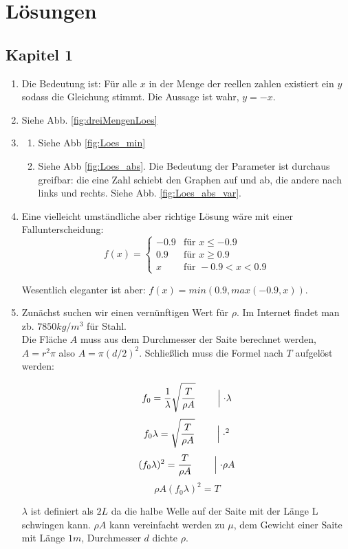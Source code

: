 \chapter{Lösungen}

\section{Kapitel 1}
\begin{enumerate}
	\item Die Bedeutung ist: Für alle $x$ in der Menge der reellen zahlen existiert ein $y$ sodass die Gleichung stimmt. Die Aussage ist wahr, $y = -x$.
    \item Siehe Abb. \ref{fig:dreiMengenLoes}
    \item 
    \begin{enumerate}
\item Siehe Abb \ref{fig:Loes_min}
\item Siehe Abb \ref{fig:Loes_abs}. Die Bedeutung der Parameter ist durchaus greifbar: die eine Zahl schiebt den Graphen auf und ab, die andere nach links und rechts. Siehe Abb. \ref{fig:Loes_abs_var}.
    \end{enumerate}

\item Eine vielleicht umständliche aber richtige Lösung wäre mit einer Fallunterscheidung:
$$ f(x) = \begin{cases} 
-0.9 & \text{für } x \leq -0.9 \\ 
0.9 & \text{für } x \geq 0.9 \\
x & \text{für }  -0.9 < x < 0.9
\end{cases}$$

Wesentlich eleganter ist aber: $f(x) = min(0.9, max(-0.9, x))$.

\item Zunächst suchen wir einen vernünftigen Wert für $\rho$. Im Internet findet man zb. $7850 kg/m^3$ für Stahl. \\
Die Fläche $A$ muss aus dem Durchmesser der Saite berechnet werden, $A = r^2 \pi$ also $A = \pi (d/2)^2$.  
Schließlich muss die Formel nach $T$ aufgelöst werden:

$$ f_0 = \frac{1}{\lambda} \sqrt{\frac{T}{\rho A}} \qquad  \Bigm\lvert \cdot \lambda$$ 
$$ f_0 \lambda =  \sqrt{\frac{T}{\rho A}} \qquad \Bigm\lvert  \cdot ^2$$
$$ (f_0 \lambda)^2 =  \frac{T}{\rho A} \qquad \Bigm\lvert \cdot \rho A$$
$$ \rho A (f_0 \lambda)^2 =  T $$ 

$\lambda$ ist definiert als $2L$ da die halbe Welle auf der Saite mit der Länge L schwingen kann. $\rho A$ kann vereinfacht werden zu $\mu$, dem Gewicht einer Saite mit Länge $1m$, Durchmesser $d$ dichte $\rho$.


\end{enumerate}
